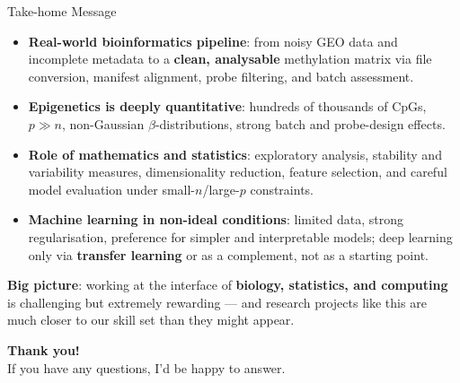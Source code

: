 \documentclass[8pt]{beamer}
\begin{document}
\begin{frame}{Take-home Message}
    \begin{itemize}[label=-]
        \item \textbf{Real-world bioinformatics pipeline}: from noisy GEO data and incomplete metadata 
              to a \textbf{clean, analysable} methylation matrix via file conversion, manifest alignment, 
              probe filtering, and batch assessment.
        \item \textbf{Epigenetics is deeply quantitative}: hundreds of thousands of CpGs, 
              \alert{$p \gg n$}, non-Gaussian $\beta$-distributions, strong batch and probe-design effects.
        \item \textbf{Role of mathematics and statistics}: exploratory analysis, 
              stability and variability measures, dimensionality reduction, feature selection, 
              and careful model evaluation under small-$n$/large-$p$ constraints.
        \item \textbf{Machine learning in non-ideal conditions}: limited data, strong regularisation, 
              preference for simpler and interpretable models; deep learning only via 
              \textbf{transfer learning} or as a complement, not as a starting point.
    \end{itemize}
    
    \vspace{0.25cm}
    {\small\color{gray}
    \textbf{Big picture}: working at the interface of \textbf{biology, statistics, and computing} 
              is challenging but extremely rewarding — and research projects like this are 
              \alert{much closer to our skill set than they might appear}.
    }
\end{frame}




\begingroup
{}  %

\begin{frame}[c]
    \color{white}   %
    \centering
    \Huge \textbf{Thank you!} \\[0.4cm]
    \Large If you have any questions, I’d be happy to answer.
\end{frame}

\endgroup
\end{document}
